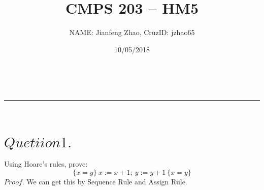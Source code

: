 \documentclass[a4paper,11pt,fleqn]{article}
\makeatletter
\newcommand{\linia}{\rule{\linewidth}{0.5pt}}
\theoremstyle{mytheor}
\renewcommand{\maketitle}{
\begin{center}
\vspace{2ex}
{\huge \textsc{\@title}}
\vspace{1ex}
\\
\linia\\
\@author \hfill \@date
\vspace{4ex}
\end{center}
}
\makeatother
\begin{document}
\title{CMPS 203 -- HM5}

\author{NAME: Jianfeng Zhao, CruzID: jzhao65}

\date{10/05/2018}

\maketitle




\section*{$Quetiion 1.$}
Using Hoare’s rules, prove:
$$\{ x = y \}\ x:=x+1;\ y:=y+1\ \{x=y\}  $$
$Proof.$ We can get this by Sequence Rule and Assign Rule.
\begin{prooftree}
\end{prooftree}
\end{document}
